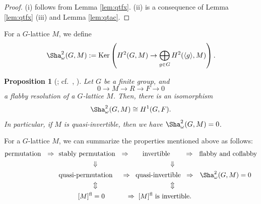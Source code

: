 \documentclass[12pt]{amsart}
\theoremstyle{plain}
\newtheorem{prop}[thm]{Proposition}
\theoremstyle{definition}
\numberwithin{thm}{section}
\numberwithin{equation}{section}
\DeclareMathOperator{\Ker}{Ker}
\DeclareMathOperator{\fl}{fl}
\begin{document}
\begin{proof}
(i) follows from Lemma \ref{lem:qtfx}. (ii) is a consequence of Lemma \ref{lem:qtfx} (iii) and Lemma \ref{lem:qtac}. 
\end{proof}

For a $G$-lattice $M$, we define
\begin{equation*}
\Sha_{\omega}^{2}(G,M):=\Ker\left(H^{2}(G,M)\rightarrow \bigoplus_{g\in G}H^{2}(\langle g\rangle,M)\right). 
\end{equation*}

\begin{prop}[{\cite[Proposition 2.9.2 (a)]{Lorenz2005}; cf.~\cite[Proposition 9.5 (ii)]{ColliotThelene1987}, \cite[Proposition 9.8]{Sansuc1981}}]\label{prop:rrs2}
Let $G$ be a finite group, and
\begin{equation*}
    0\rightarrow M \rightarrow R \rightarrow F \rightarrow 0
\end{equation*}
a flabby resolution of a $G$-lattice $M$. Then, there is an isomorphism
\begin{equation*}
    \Sha_{\omega}^{2}(G,M)\cong H^{1}(G,F). 
\end{equation*}
In particular, if $M$ is quasi-invertible, then we have $\Sha_{\omega}^{2}(G,M)=0$. 
\end{prop}

For a $G$-lattice $M$, we can summarize the properties mentioned above as follows:
\begin{align*}
\textrm{permutation}\ \ 
\Rightarrow\ \ 
&\textrm{stably permutation}\ \ 
\Rightarrow\ \ 
\hspace*{4mm}\textrm{invertible}\hspace*{5mm}\ \ 
\Rightarrow\ \ 
\textrm{flabby\ and\ coflabby}\\
&\hspace*{17mm}\Downarrow\hspace*{38mm} \Downarrow\hspace*{35mm} \\
&\textrm{quasi-permutation} 
\hspace*{4.5mm}\Rightarrow\hspace*{2mm} \textrm{quasi-invertible}
\hspace*{2mm}\Rightarrow\hspace*{2.5mm} \Sha^2_{\omega}(G,M)=0\\
&\hspace*{17mm}\Updownarrow\hspace*{38mm} \Updownarrow 
\ \ \\
&\hspace*{10mm}\textrm{$[M]^{\fl}=0$} 
\hspace*{11mm}\Rightarrow\hspace*{1mm} \textrm{$[M]^{\fl}$ is invertible}. \\
\end{align*}
\end{document}
